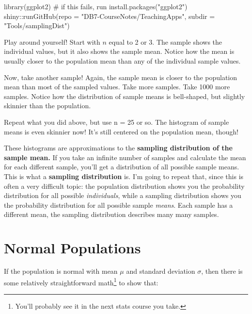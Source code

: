 \documentclass[
  letterpaper,
  DIV=11,
  numbers=noendperiod,
  oneside]{scrreprt}
\newenvironment{Shaded}{\begin{snugshade}}{\end{snugshade}}
\newcommand{\AttributeTok}[1]{\textcolor[rgb]{0.40,0.45,0.13}{#1}}
\newcommand{\CommentTok}[1]{\textcolor[rgb]{0.37,0.37,0.37}{#1}}
\newcommand{\FunctionTok}[1]{\textcolor[rgb]{0.28,0.35,0.67}{#1}}
\newcommand{\NormalTok}[1]{\textcolor[rgb]{0.00,0.23,0.31}{#1}}
\newcommand{\SpecialCharTok}[1]{\textcolor[rgb]{0.37,0.37,0.37}{#1}}
\newcommand{\StringTok}[1]{\textcolor[rgb]{0.13,0.47,0.30}{#1}}
\begin{document}
\begin{Shaded}
\begin{Highlighting}[]
\FunctionTok{library}\NormalTok{(ggplot2) }\CommentTok{\# if this fails, run install.packages("ggplot2")}
\NormalTok{shiny}\SpecialCharTok{::}\FunctionTok{runGitHub}\NormalTok{(}\AttributeTok{repo =} \StringTok{"DB7{-}CourseNotes/TeachingApps"}\NormalTok{, }
    \AttributeTok{subdir =} \StringTok{"Tools/samplingDist"}\NormalTok{)}
\end{Highlighting}
\end{Shaded}

Play around yourself! Start with \(n\) equal to 2 or 3. The sample shows
the individual values, but it also shows the sample mean. Notice how the
mean is usually closer to the population mean than any of the individual
sample values.

Now, take another sample! Again, the sample mean is closer to the
population mean than most of the sampled values. Take more samples. Take
1000 more samples. Notice how the distribution of sample means is
bell-shaped, but slightly skinnier than the population.

Repeat what you did above, but use n = 25 or so. The histogram of sample
means is even skinnier now! It's still centered on the population mean,
though!

These histograms are approximations to the \textbf{sampling distribution
of the sample mean.} If you take an infinite number of samples and
calculate the mean for each different sample, you'll get a distribution
of all possible sample means. This is what a \textbf{sampling
distribution} is. I'm going to repeat that, since this is often a very
difficult topic: the population distribution shows you the probability
distribution for all possible \emph{individuals}, while a sampling
distribution shows you the probability distribution for all possible
sample \emph{means}. Each sample has a different mean, the sampling
distribution describes many many samples.

\hypertarget{normal-populations}{%
\section{Normal Populations}\label{normal-populations}}

If the population is normal with mean \(\mu\) and standard deviation
\(\sigma\), then there is some relatively straightforward
math\footnote{You'll probably see it in the next stats course you take.}
to show that:
\end{document}

